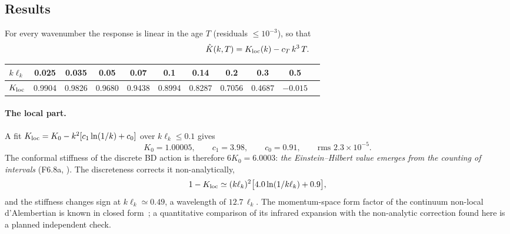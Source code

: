 \subsection{Results}

For every wavenumber the response is linear in the age $T$ (residuals $\le10^{-3}$), so that
\begin{equation}\label{eq:Khat}
  \hat K(k,T)=K_{\rm loc}(k)-c_T\,k^3\,T .
\end{equation}

\begin{center}
\begin{tabular}{ccccccccccc}
\toprule
$k\ell_k$ & 0.025 & 0.035 & 0.05 & 0.07 & 0.1 & 0.14 & 0.2 & 0.3 & 0.5\\
\midrule
$K_{\rm loc}$ & 0.9904 & 0.9826 & 0.9680 & 0.9438 & 0.8994 & 0.8287 & 0.7056 & 0.4687 & $-0.015$\\
\bottomrule
\end{tabular}
\end{center}

\paragraph{The local part.} A fit $K_{\rm loc}=K_0-k^2[c_1\ln(1/k)+c_0]$ over $k\ell_k\le0.1$ gives
\begin{equation}
  K_0=1.00005,\qquad c_1=3.98,\qquad c_0=0.91,\qquad\text{rms }2.3\times10^{-5}.
\end{equation}
The conformal stiffness of the discrete BD action is therefore $6K_0=6.0003$: \emph{the Einstein--Hilbert
value emerges from the counting of intervals} (F6.8a, ). The discreteness corrects it
non-analytically,
\begin{equation}
  1-K_{\rm loc}\simeq(k\ell_k)^2\big[4.0\ln(1/k\ell_k)+0.9\big],
\end{equation}
and the stiffness changes sign at $k\ell_k\simeq0.49$, a wavelength of $12.7\,\ell_k$. The momentum-space form
factor of the continuum non-local d'Alembertian is known in closed form~\cite{AslanbeigiSaravaniSorkin2014,
BelenchiaBenincasaLiberati2015}; a quantitative comparison of its infrared expansion with the non-analytic
correction found here is a planned independent check.

